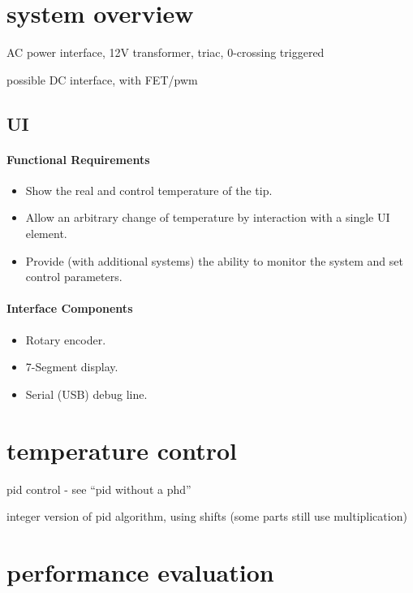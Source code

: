
\section{system overview}

AC power interface, 12V transformer, triac, 0-crossing triggered

possible DC interface, with FET/pwm


\subsection{UI}
\paragraph{Functional Requirements}

\begin{itemize}
	\item Show the real and control temperature of the tip.
	\item Allow an arbitrary change of temperature by interaction
		with a single UI element.
	\item Provide (with additional systems) the ability to monitor
		the system and set control parameters.
\end{itemize}
\paragraph{Interface Components}
\begin{itemize}
	\item Rotary encoder.
	\item 7-Segment display.
	\item Serial (USB) debug line.
\end{itemize}

\section{temperature control}

pid control - see ``pid without a phd''

integer version of pid algorithm, using shifts
(some parts still use multiplication)

\section{performance evaluation}



